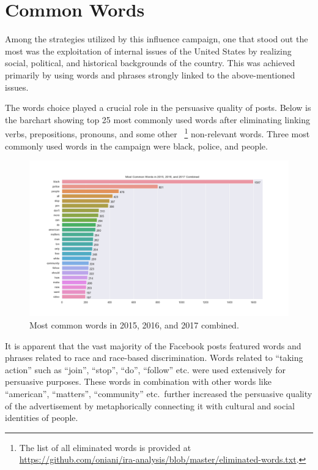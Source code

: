 \documentclass[12pt]{article}
\theoremstyle{definition}
\begin{document}

\section*{\centering Common Words}

Among the strategies utilized by this influence campaign, one that stood out
the most was the exploitation of internal issues of the United States by
realizing social, political, and historical backgrounds of the country.
This was achieved primarily by using words and phrases strongly linked to the
above-mentioned issues.

\bigskip

The words choice played a crucial role in the persuasive quality of posts.
Below is the barchart showing top 25 most commonly used words after eliminating
linking verbs, prepositions, pronouns, and some other
~\footnote{The list of all eliminated words is provided at\\
\url{https://github.com/oniani/ira-analysis/blob/master/eliminated-words.txt}.}
non-relevant words. Three most commonly used words in the campaign were black,
police, and people.

\begin{figure}[H]
\centering
\includegraphics[width=\columnwidth]{./image/barchart-plots/barchart_word_counts.png}
\caption{Most common words in 2015, 2016, and 2017 combined.}
\end{figure}

It is apparent that the vast majority of the Facebook posts featured words and
phrases related to race and race-based discrimination. Words related to
``taking action'' such as ``join'', ``stop'', ``do'', ``follow'' etc. were used
extensively for persuasive purposes. These words in combination with other words
like ``american'', ``matters'', ``community'' etc.~further increased the
persuasive quality of the advertisement by metaphorically connecting it with
cultural and social identities of people.
\end{document}
